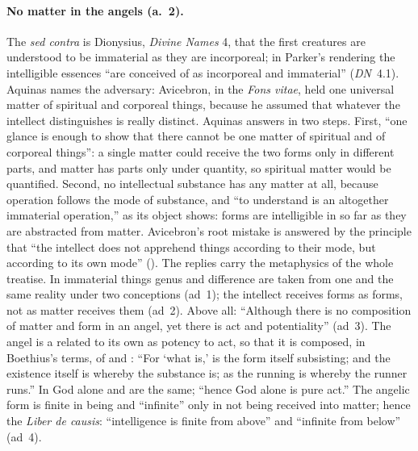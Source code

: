 \paragraph{No matter in the angels (a.~2).} The \emph{sed contra} is
Dionysius, \emph{Divine Names} 4, that the first creatures are understood
to be immaterial as they are incorporeal; in Parker's rendering the
intelligible essences ``are conceived of as incorporeal and immaterial''
(\emph{DN}~4.1). Aquinas names the adversary: Avicebron, in the \emph{Fons
vitae}, held one universal matter of spiritual and corporeal things,
because he assumed that whatever the intellect distinguishes is really
distinct. Aquinas answers in two steps. First, ``one glance is enough to
show that there cannot be one matter of spiritual and of corporeal
things'': a single matter could receive the two forms only in different
parts, and matter has parts only under quantity, so spiritual matter would
be quantified. Second, no intellectual substance has any matter at all,
because operation follows the mode of substance, and ``to understand is an
altogether immaterial operation,'' as its object shows: forms are
intelligible in so far as they are abstracted from matter. Avicebron's root
mistake is answered by the principle that ``the intellect does not
apprehend things according to their mode, but according to its own mode''
(). The replies carry the metaphysics of the whole treatise. In
immaterial things genus and difference are taken from one and the same
reality under two conceptions (ad~1); the intellect receives forms as
forms, not as matter receives them (ad~2). Above all: ``Although there is
no composition of matter and form in an angel, yet there is act and
potentiality'' (ad~3). The angel is a  related to
its own  as potency to act, so that it is composed, in
Boethius's terms, of  and : ``For `what is,' is
the form itself subsisting; and the existence itself is whereby the
substance is; as the running is whereby the runner runs.'' In God alone
 and  are the same; ``hence God alone is pure
act.'' The angelic form is finite in being and ``infinite'' only in not
being received into matter; hence the \emph{Liber de causis}: ``intelligence
is finite from above'' and ``infinite from below'' (ad~4).

